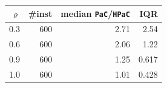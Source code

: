 \begin{tabular}{@{}rrrr@{}}
\toprule
$\varrho$ & \#inst & median \texttt{PaC}/\texttt{HPaC} & IQR \\
\midrule
0.3 & 600 & 2.71 & 2.54 \\
0.6 & 600 & 2.06 & 1.22 \\
0.9 & 600 & 1.25 & 0.617 \\
1.0 & 600 & 1.01 & 0.428 \\
\bottomrule
\end{tabular}
